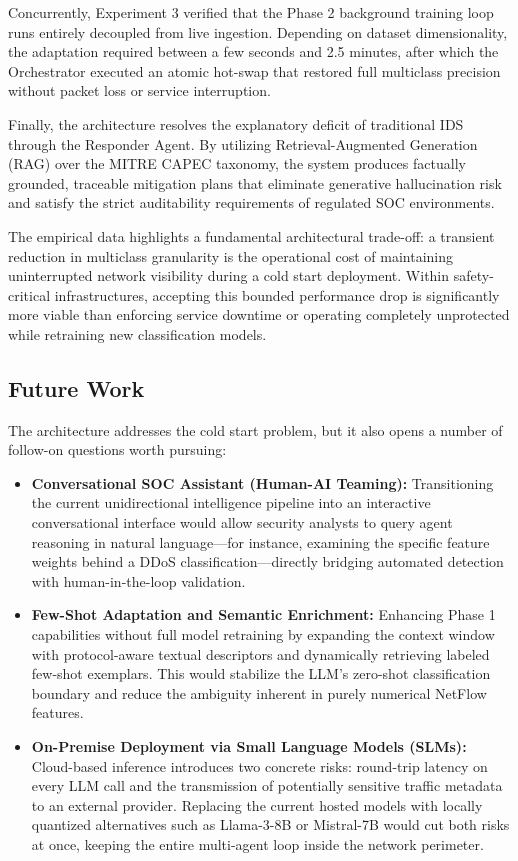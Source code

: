 \documentclass[conference]{IEEEtran}
\begin{document}
Concurrently, Experiment 3 verified that the Phase 2 background training loop runs entirely decoupled from live ingestion. Depending on dataset dimensionality, the adaptation required between a few seconds and 2.5 minutes, after which the Orchestrator executed an atomic hot-swap that restored full multiclass precision without packet loss or service interruption.

Finally, the architecture resolves the explanatory deficit of traditional IDS through the Responder Agent. By utilizing Retrieval-Augmented Generation (RAG) over the MITRE CAPEC taxonomy, the system produces factually grounded, traceable mitigation plans that eliminate generative hallucination risk and satisfy the strict auditability requirements of regulated SOC environments.

The empirical data highlights a fundamental architectural trade-off: a transient reduction in multiclass granularity is the operational cost of maintaining uninterrupted network visibility during a cold start deployment. Within safety-critical infrastructures, accepting this bounded performance drop is significantly more viable than enforcing service downtime or operating completely unprotected while retraining new classification models.

\subsection{Future Work}

The architecture addresses the cold start problem, but it also opens a number of follow-on questions worth pursuing:

\begin{itemize}
    \item \textbf{Conversational SOC Assistant (Human-AI Teaming):} Transitioning the current unidirectional intelligence pipeline into an interactive conversational interface would allow security analysts to query agent reasoning in natural language---for instance, examining the specific feature weights behind a DDoS classification---directly bridging automated detection with human-in-the-loop validation.

    \item \textbf{Few-Shot Adaptation and Semantic Enrichment:} Enhancing Phase 1 capabilities without full model retraining by expanding the context window with protocol-aware textual descriptors and dynamically retrieving labeled few-shot exemplars. This would stabilize the LLM's zero-shot classification boundary and reduce the ambiguity inherent in purely numerical NetFlow features.

    \item \textbf{On-Premise Deployment via Small Language Models (SLMs):} Cloud-based inference introduces two concrete risks: round-trip latency on every LLM call and the transmission of potentially sensitive traffic metadata to an external provider. Replacing the current hosted models with locally quantized alternatives such as Llama-3-8B or Mistral-7B would cut both risks at once, keeping the entire multi-agent loop inside the network perimeter.

\end{itemize}
\end{document}
